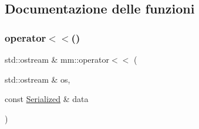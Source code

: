 \subsection{Documentazione delle funzioni}
\mbox{\label{namespacemm_a7ab9a5d20c82db4778995f35e6aa6abb}} 
\subsubsection{\texorpdfstring{operator$<$$<$()}{operator<<()}}
{\footnotesize\ttfamily std\+::ostream \& mm\+::operator$<$$<$ (\begin{DoxyParamCaption}\item[{std\+::ostream \&}]{os,  }\item[{const \mbox{\hyperlink{structmm_1_1_serialized}{Serialized}} \&}]{data }\end{DoxyParamCaption})}


